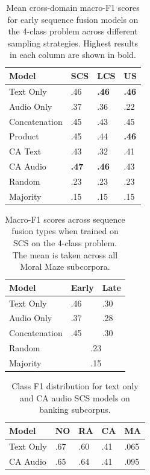 \documentclass[twocolumn,twoside]{article}
\begin{document}
\begin{table}[h]
\centering
\caption{Mean cross-domain macro-F1 scores for early sequence fusion models on the 4-class problem across different sampling strategies. Highest results in each column are shown in bold.\label{tbl:results-cd-4class-sampling}}
\begin{tabular}{|l|lll|}
\hline
Model         & SCS          & LCS          & US           \\ \hline
Text Only     & .46          & \textbf{.46} & \textbf{.46}          \\
Audio Only    & .37          & .36          & .22          \\ \hline
Concatenation & .45          & .43          & .45          \\
Product       & .45          & .44          & \textbf{.46}          \\
CA Text       & .43          & .32          & .41          \\
CA Audio      & \textbf{.47} & \textbf{.46} & .43 \\ \hline
Random        & .23          & .23          & .23          \\
Majority      & .15          & .15          & .15          \\ \hline
\end{tabular}
\end{table}

\begin{table}[h]
\centering
\caption{Macro-F1 scores across sequence fusion types when trained on SCS on the 4-class problem. The mean is taken across all Moral Maze subcorpora. \label{tbl:results-seq-4class-cd}}
\begin{tabular}{|l|ll|}
\hline
Model         & Early       & Late      \\ \hline
Text Only     & .46         & .30       \\
Audio Only    & .37         & .28       \\
Concatenation & .45         & .30       \\ \hline
Random        & \multicolumn{2}{c|}{.23} \\
Majority      & \multicolumn{2}{c|}{.15} \\ \hline
\end{tabular}
\end{table}

\begin{table}[h]
\centering
\caption{Class F1 distribution for text only and CA audio SCS models on banking subcorpus.\label{tbl:class-f1-4class-banking}}
\begin{tabular}{|l|llll|}
\hline
Model     & NO & RA & CA & MA              \\ \hline
Text Only & .67         & .60         & .41         & .065 \\
CA Audio  & .65         & .64         & .41         & .095 \\ \hline
\end{tabular}
\end{table}
\end{document}
